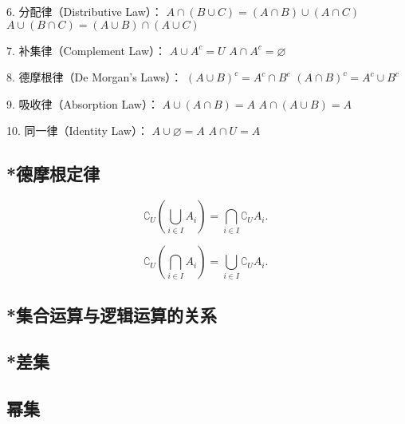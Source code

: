 	6.	分配律（Distributive Law）：
$ A \cap (B \cup C) = (A \cap B) \cup (A \cap C) $
$ A \cup (B \cap C) = (A \cup B) \cap (A \cup C) $

	7.	补集律（Complement Law）：
$ A \cup A^c = U $
$A \cap A^c = \varnothing$

	8.	德摩根律（De Morgan’s Laws）：
$ (A \cup B)^c = A^c \cap B^c $
$ (A \cap B)^c = A^c \cup B^c $

	9.	吸收律（Absorption Law）：
$ A \cup (A \cap B) = A $
$ A \cap (A \cup B) = A $

	10.	同一律（Identity Law）：
$A \cup \varnothing = A$
$ A \cap U = A $
 
\subsection{*德摩根定律}


\begin{equation}
\complement_U(\bigcup_{i\in I} A_i)=\bigcap_{i\in I} \complement_UA_i.~
\end{equation}

\begin{equation}
\complement_U(\bigcap_{i\in I} A_i)=\bigcup_{i\in I} {\complement_UA_i}.~
\end{equation}


\subsection{*集合运算与逻辑运算的关系}



\subsection{*差集}

\subsection{幂集}
